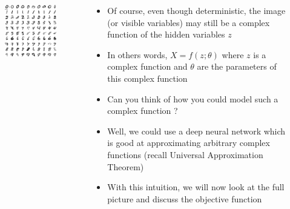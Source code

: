 \documentclass[serif,aspectratio=169,dvipsnames]{beamer}
\begin{document}
\begin{frame}
	\begin{columns}
		\begin{overlayarea}{\textwidth}{\textheight}
			\vspace{3pt}
			\begin{figure}
				\centering
				\includegraphics[scale=0.3]{images/mnist.png}
			\end{figure}
		\end{overlayarea}
		\begin{overlayarea}{\textwidth}{\textheight}
			\begin{itemize}\justifying
				\item<1-> Of course, even though deterministic, the image (or visible variables) may still be a complex function of the hidden variables $z$
				\item<2-> In others words, $X = f (z; \theta)$ where $z$ is a complex function and $\theta$ are the parameters of this complex function
				\item<3-> Can you think of how you could model such a complex function ? 
				\item<4-> Well, we could use a deep neural network which is good at approximating arbitrary complex functions (recall Universal Approximation Theorem)
				\item<5-> With this intuition, we will now look at the full picture and discuss the objective function
			\end{itemize}
		\end{overlayarea}
	\end{columns}
\end{frame}
\end{document}
